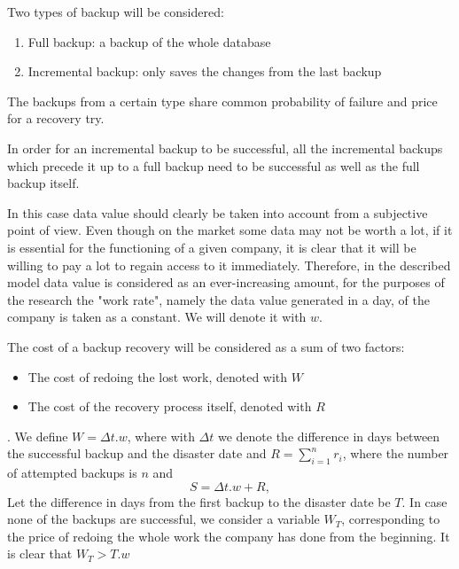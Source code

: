 \documentclass[11pt, a4paper]{article}
\theoremstyle{definition}
\begin{document}
		Two types of backup will be considered:
		\begin{enumerate}
			\item Full backup: a backup of the whole database
			\item Incremental backup: only saves the changes from the last backup
		\end{enumerate}
		The backups from a certain type share common probability of failure and price for a recovery try.\par
		In order for an incremental backup to be successful, all the incremental backups which precede it up to a full backup need to be successful as well as the full backup itself.\par
		In this case data value should clearly be taken into account from a subjective point of view. Even though on the market some data may not be worth a lot, if it is essential for the functioning of a given company, it is clear that it will be willing to pay a lot to regain access to it immediately. Therefore, in the described model data value is considered as an ever-increasing amount, for the purposes of the research the "work rate", namely the data value generated in a day, of the company is taken as a constant. We will denote it with $w$.\par
		The cost of a backup recovery will be considered as a sum of two factors:
		\begin{itemize}
			\item The cost of redoing the lost work, denoted with $W$
			\item The cost of the recovery process itself, denoted with $R$
		\end{itemize}.
		We define $W = \Delta t.w$, where with $\Delta t$ we denote the difference in days between the successful backup and the disaster date and $R = \sum_{i=1}^{n} r_i$, where the number of attempted backups is $n$ and 
		$$
		S=\Delta t.w + R,
		$$
		Let the difference in days from the first backup to the disaster date be $T$. In case none of the backups are successful, we consider a variable $W_T$, corresponding to the price of redoing the whole work the company has done from the beginning. It is clear that $W_T>T.w$\par
\end{document}
